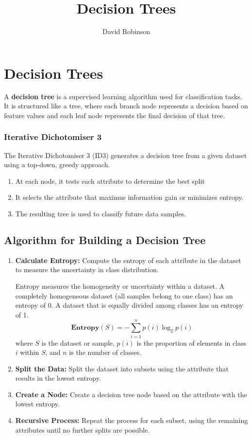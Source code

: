 \documentclass{article}
\title{Decision Trees}
\author{David Robinson}
\date{}
\begin{document}
\maketitle

\section*{Decision Trees}

A \textbf{decision tree} is a supervised learning algorithm used for classification tasks. It is structured like a tree, where each branch node represents a decision based on feature values and each leaf node represents the final decision of that tree.

\subsubsection*{Iterative Dichotomiser 3}

The Iterative Dichotomiser 3 (ID3) generates a decision tree from a given dataset using a top-down, greedy approach.
\begin{enumerate}
    \item At each node, it tests each attribute to determine the best split
    \item It selects the attribute that maximus information gain or minimizes entropy.
    \item The resulting tree is used to classify future data samples.
\end{enumerate}

\subsection*{Algorithm for Building a Decision Tree}

\begin{enumerate}
    \item \textbf{Calculate Entropy:} Compute the entropy of each attribute in the dataset to measure the uncertainty in class distribution.
    
    Entropy measures the homogeneity or uncertainty within a dataset. A completely homogeneous dataset (all samples belong to one class) has an entropy of 0. A dataset that is equally divided among classes has an entropy of 1.
    \[\textbf{Entropy}(S)=-\sum_{i=1}^n p(i)\log_2 p(i)\] where $S$ is the dataset or sample, $p(i)$ is the proportion of elements in class $i$ within $S$, and $n$ is the number of classes.
    \item \textbf{Split the Data:} Split the dataset into subsets using the attribute that results in the lowest entropy.
    \item \textbf{Create a Node:} Create a decision tree node based on the attribute with the lowest entropy.
    \item \textbf{Recursive Process:} Repeat the process for each subset, using the remaining attributes until no further splits are possible.
\end{enumerate}
\end{document}
